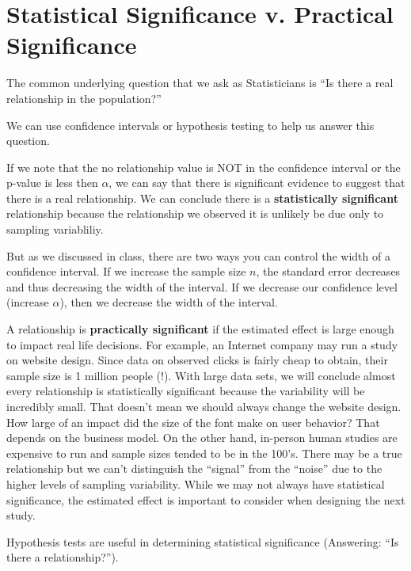 \documentclass[
]{book}
\begin{document}
\hypertarget{statistical-significance-v.-practical-significance}{%
\section{Statistical Significance v. Practical Significance}\label{statistical-significance-v.-practical-significance}}

The common underlying question that we ask as Statisticians is ``Is there a real relationship in the population?''

We can use confidence intervals or hypothesis testing to help us answer this question.

If we note that the no relationship value is NOT in the confidence interval or the p-value is less then \(\alpha\), we can say that there is significant evidence to suggest that there is a real relationship. We can conclude there is a \textbf{statistically significant} relationship because the relationship we observed it is unlikely be due only to sampling variabliliy.

But as we discussed in class, there are two ways you can control the width of a confidence interval. If we increase the sample size \(n\), the standard error decreases and thus decreasing the width of the interval. If we decrease our confidence level (increase \(\alpha\)), then we decrease the width of the interval.

A relationship is \textbf{practically significant} if the estimated effect is large enough to impact real life decisions. For example, an Internet company may run a study on website design. Since data on observed clicks is fairly cheap to obtain, their sample size is 1 million people (!). With large data sets, we will conclude almost every relationship is statistically significant because the variability will be incredibly small. That doesn't mean we should always change the website design. How large of an impact did the size of the font make on user behavior? That depends on the business model. On the other hand, in-person human studies are expensive to run and sample sizes tended to be in the 100's. There may be a true relationship but we can't distinguish the ``signal'' from the ``noise'' due to the higher levels of sampling variability. While we may not always have statistical significance, the estimated effect is important to consider when designing the next study.

Hypothesis tests are useful in determining statistical significance (Answering: ``Is there a relationship?'').
\end{document}
